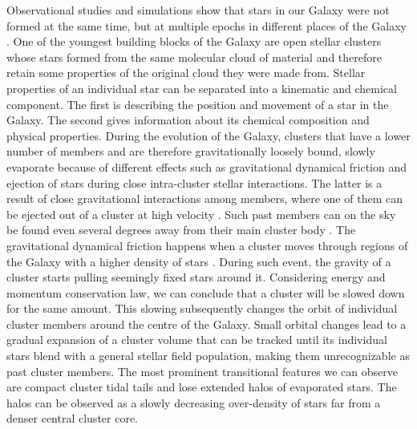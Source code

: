 Observational studies and simulations show that stars in our Galaxy were not formed at the same time, but at multiple epochs in different places of the Galaxy \cite{2001ApJ...554.1044C, 2017ARA&A..55...59N}. One of the youngest building blocks of the Galaxy are open stellar clusters whose stars formed from the same molecular cloud of material \cite{2003ARA&A..41...57L} and therefore retain some properties of the original cloud they were made from. Stellar properties of an individual star can be separated into a kinematic and chemical component. The first is describing the position and movement of a star in the Galaxy. The second gives information about its chemical composition and physical properties. During the evolution of the Galaxy, clusters that have a lower number of members and are therefore gravitationally loosely bound, slowly evaporate because of different effects such as gravitational dynamical friction and ejection of stars during close intra-cluster stellar interactions. The latter is a result of close gravitational interactions among members, where one of them can be ejected out of a cluster at high velocity \cite{2009MNRAS.396..570G, 2010MNRAS.402..105G, 2017MNRAS.470.3049R}. Such past members can on the sky be found even several degrees away from their main cluster body \cite{2007MNRAS.376L..29G, 2018MNRAS.473.4612K, 2019ApJ...884....6M}. The gravitational dynamical friction happens when a cluster moves through regions of the Galaxy with a higher density of stars \cite{2010MNRAS.401.2753B}. During such event, the gravity of a cluster starts pulling seemingly fixed stars around it. Considering energy and momentum conservation law, we can conclude that a cluster will be slowed down for the same amount. This slowing subsequently changes the orbit of individual cluster members around the centre of the Galaxy. Small orbital changes lead to a gradual expansion of a cluster volume that can be tracked until its individual stars blend with a general stellar field population, making them unrecognizable as past cluster members. The most prominent transitional features we can observe are compact cluster tidal tails \cite{2019AA...627A...4R, 2019AJ....157..115Y, 2019AA...621L...3M, 2019arXiv191206657Z} and lose extended halos of evaporated stars. The halos can be observed as a slowly decreasing over-density \cite{2002A&A...385..471C, 2004A&A...427..485B, 2019AA...627A.119C} of stars far from a denser central cluster core.

